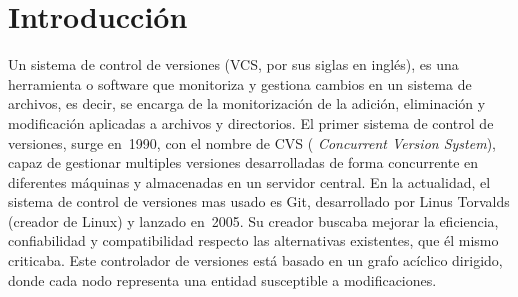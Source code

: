 \chapter{Introducción\label{01intro}}






Un sistema de control de versiones (VCS, por sus siglas en inglés), es una
herramienta o software que monitoriza y gestiona cambios en un sistema de
archivos, es decir, se encarga de la monitorización de la adición,
eliminación y modificación aplicadas a archivos y directorios. El primer
sistema de control de versiones, surge en~1990, con el nombre de CVS ({\em
  Concurrent Version System}), capaz de gestionar multiples versiones
desarrolladas de forma concurrente en diferentes máquinas y almacenadas en
un servidor central. En la actualidad, el sistema de control de versiones
mas usado es Git\cite{git}, desarrollado por Linus Torvalds (creador de
Linux) y lanzado en~2005. Su creador buscaba mejorar la eficiencia,
confiabilidad y compatibilidad respecto las alternativas existentes, que él
mismo criticaba. Este controlador de versiones está basado en un grafo
acíclico dirigido, donde cada nodo representa una entidad susceptible a
modificaciones.

